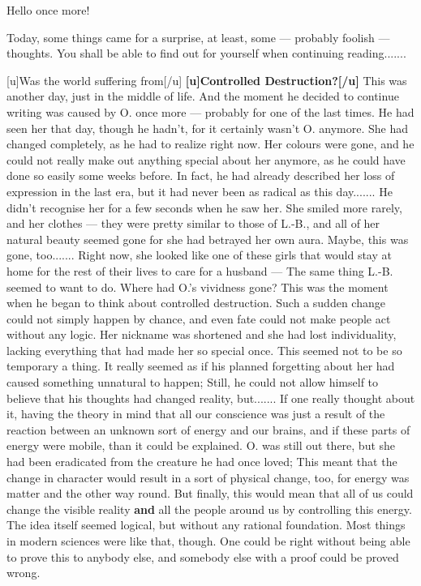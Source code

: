 Hello once more! 

Today, some things came for a surprise, at least, some --- probably foolish --- thoughts. You shall be able to find out for yourself when continuing reading....... 

[u]Was the world suffering from[/u]
\textbf{[u]Controlled Destruction?[/u]}
This was another day, just in the middle of life. And the moment he decided to continue writing was caused by O. once more --- probably for one of the last times. 
He had seen her that day, though he hadn't, for it certainly wasn't O. anymore. She had changed completely, as he had to realize right now. 
Her colours were gone, and he could not really make out anything special about her anymore, as he could have done so easily some weeks before. In fact, he had already described her loss of expression in the last era, but it had never been as radical as this day....... 
He didn't recognise her for a few seconds when he saw her. She smiled more rarely, and her clothes --- they were pretty similar to those of L.-B., and all of her natural beauty seemed gone for she had betrayed her own aura. Maybe, this was gone, too....... 
Right now, she looked like one of these girls that would stay at home for the rest of their lives to care for a husband --- The same thing L.-B. seemed to want to do. Where had O.'s vividness gone? 
This was the moment when he began to think about controlled destruction. Such a sudden change could not simply happen by chance, and even fate could not make people act without any logic. Her nickname was shortened and she had lost individuality, lacking everything that had made her so special once. This seemed not to be so temporary a thing. It really seemed as if his planned forgetting about her had caused something unnatural to happen; Still, he could not allow himself to believe that his thoughts had changed reality, but....... 
If one really thought about it, having the theory in mind that all our conscience was just a result of the reaction between an unknown sort of energy and our brains, and if these parts of energy were mobile, than it could be explained. O. was still out there, but she had been eradicated from the creature he had once loved; This meant that the change in character would result in a sort of physical change, too, for energy was matter and the other way round. But finally, this would mean that all of us could change the visible reality \textbf{and} all the people around us by controlling this energy. The idea itself seemed logical, but without any rational foundation. 
Most things in modern sciences were like that, though. One could be right without being able to prove this to anybody else, and somebody else with a proof could be proved wrong. 
